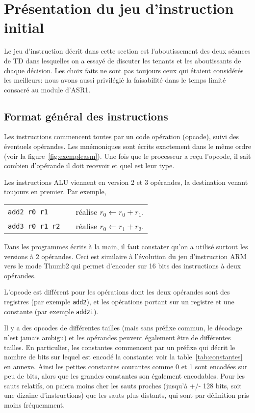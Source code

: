 \documentclass[architecture]{compas2018}
\newcommand{\todo}[1]{\textcolor{red}{TODO: #1}}
\begin{document}
\section{Présentation du jeu d'instruction initial}
Le jeu d'instruction décrit dans cette section est l'aboutissement des deux séances de TD dans lesquelles on a essayé de discuter les tenants et les aboutissants de chaque décision.
Les choix faits ne sont pas toujours ceux qui étaient considérés les meilleurs: nous avons aussi privilégié la faisabilité dans le temps limité consacré au module d'ASR1.



\subsection{Format général des instructions}
Les instructions commencent toutes par un code opération (opcode), suivi des éventuels opérandes.
Les mnémoniques sont écrits exactement dans le même ordre (voir la figure~\ref{fig:exempleasm}).  
Une fois que le processeur a reçu l'opcode, il sait combien d'opérande il doit recevoir et quel est leur type.


Les instructions ALU viennent en version 2 et 3 opérandes, la destination venant toujours en premier.
Par exemple, \\
  \begin{tabular}{lcl}
 \texttt{add2 r0 r1}&& réalise $r_0 \leftarrow r_0+r_1$. \\
 \texttt{add3 r0 r1 r2}&& réalise $r_0 \leftarrow r_1+r_2$.
  \end{tabular}
  Dans les programmes écrits à la main, il faut constater qu'on a utilisé surtout les versions à 2 opérandes.
  Ceci est similaire à l'évolution du jeu d'instruction ARM vers le mode Thumb2 qui permet d'encoder sur 16 bits des instructions à deux opérandes. 
  
 L'opcode est différent pour les opérations dont les deux opérandes  sont des registres (par exemple \texttt{add2}), et les opérations portant sur un registre et une constante (par exemple \texttt{add2i}).

Il y a des opcodes de différentes tailles (mais sans préfixe commun, le décodage n'est jamais ambigu)  et les opérandes peuvent également être de différentes tailles.
En particulier, les constantes commencent par un préfixe qui décrit le nombre de bits sur lequel est encodé la constante: voir la table~\ref{tab:constantes} en annexe.
Ainsi les petites constantes courantes comme 0 et 1 sont encodées sur peu de bits, alors que les grandes constantes son également encodables.
Pour les sauts relatifs, on paiera moins cher les sauts proches (jusqu'à +/- 128 bits, soit une dizaine d'instructions) que les sauts plus distants, qui sont par définition pris moins fréquemment.
\end{document}
